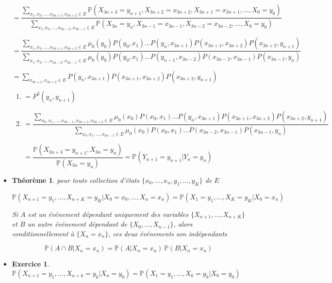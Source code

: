 \documentclass[10pt,a4paper,oneside]{article}
\newtheorem{theoreme}{Théorème}
\newtheorem{exercice}{Exercice}
\begin{document}
\begin{itemize}
$= \dfrac{\sum_{x_1,x_2,\ldots,x_{3n + 1},x_{3n + 2} \in E} \mathbb{P}(X_{3n + 3} = y_{n + 1},X_{3n + 2} = x_{3n + 2},X_{3n + 1} = x_{3n + 1},\ldots,X_0 = y_0)}{\sum_{x_1,x_2,\ldots,x_{3n - 2},x_{3n - 1} \in E} \mathbb{P}(X_{3n} = y_n,X_{3n - 1} = x_{3n - 1},X_{3n - 2} = x_{3n - 2},\ldots,X_0 = y_0)}$

$= \dfrac{\sum_{x_1,x_2,\ldots,x_{3n + 1},x_{3n + 2} \in E} \mu_0(y_0) P(y_0,x_1) \ldots P(y_n,x_{3n + 1}) P(x_{3n + 1},x_{3n + 2}) P(x_{3n + 2},y_{n + 1})}{\sum_{x_1,x_2,\ldots,x_{3n - 2},x_{3n - 1} \in E} \mu_0(y_0) P(y_0,x_1) \ldots P(y_{n - 1},x_{3n - 2}) P(x_{3n - 2},x_{3n - 1}) P(x_{3n - 1},y_n)}$

$= \sum_{x_{3n + 1},x_{3n + 2} \in E} P(y_n,x_{3n + 1}) P(x_{3n + 1},x_{3n + 2}) P(x_{3n + 2},y_{n + 1})$

\begin{enumerate}
\item
$= P^3(y_n,y_{n + 1})$

\item
$= \dfrac{\sum_{x_0,x_1,\ldots,x_{3n - 1},x_{3n + 1},x_{3n + 2} \in E} \mu_0(x_0) P(x_0,x_1) \ldots P(y_{n},x_{3n + 1}) P(x_{3n + 1},x_{3n + 2}) P(x_{3n + 2},y_{n + 1})}{\sum_{x_0,x_1,\ldots,x_{3n - 1} \in E} \mu_0(x_0) P(x_0,x_1) \ldots P(x_{3n - 2},x_{3n - 1}) P(x_{3n - 1},y_n)}$

$= \dfrac{\mathbb{P}(X_{3n + 3} = y_{n + 1}, X_{3n} = y_n)}{\mathbb{P}(X_{3n} = y_n)} = \mathbb{P}(Y_{n + 1} = y_{n + 1} | Y_n = y_n)$
\end{enumerate}

\item
\begin{theoreme}
pour toute collection d'états $\{ x_0,\ldots,x_n,y_1,\ldots,y_K \}$ de $E$

\[ \boxed{ \mathbb{P}(X_{n + 1} = y_1,\ldots,X_{n + K} = y_K | X_0 = x_0,\ldots,X_n = x_n) = \mathbb{P}(X_1 = y_1,\ldots,X_K = y_K | X_0 = x_n) } \]

Si $A$ est un événement dépendant uniquement des variables $\{ X_{n + 1},\ldots,X_{n + K} \}$ et $B$ un autre événement dépendant de $\{ X_0,\ldots,X_{n - 1} \}$, alors conditionnellement à $\{ X_n = x_n \}$, ces deux événements son indépendants

\[ \mathbb{P}(A \cap B | X_n = x_n) = \mathbb{P}(A | X_n = x_n)\ \mathbb{P}(B | X_n = x_n) \]
\end{theoreme}

\item
\begin{exercice}
$\boxed{ \mathbb{P}(X_{n + 1} = y_1,\ldots,X_{n + k} = y_k | X_n = y_0) = \mathbb{P}(X_1 = y_1,\ldots,X_k = y_k | X_0 = y_0)}$
\end{exercice}


\end{itemize}
\end{document}
